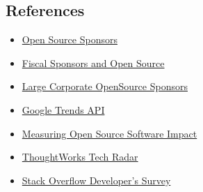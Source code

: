 \hypertarget{references}{%
\subsection{References}\label{references}}

\begin{itemize}
\tightlist
\item
  \href{https://opensource.org/sponsors}{Open Source Sponsors}
\item
  \href{https://opensource.com/article/19/1/fiscal-sponsors-open-source}{Fiscal
  Sponsors and Open Source}
\item
  \href{https://www.networkworld.com/article/2867020/big-names-like-google-dominate-open-source-funding.html}{Large
  Corporate OpenSource Sponsors}
\item
  \href{https://www.npmjs.com/package/google-trends-api}{Google Trends
  API}
\item
  \href{https://aisel.aisnet.org/cgi/viewcontent.cgi?article=1496\&context=amcis2018}{Measuring
  Open Source Software Impact}
\item
  \href{https://www.thoughtworks.com/radar}{ThoughtWorks Tech Radar}
\item
  \href{https://insights.stackoverflow.com/survey/2019\#technology}{Stack
  Overflow Developer's Survey}
\end{itemize}
